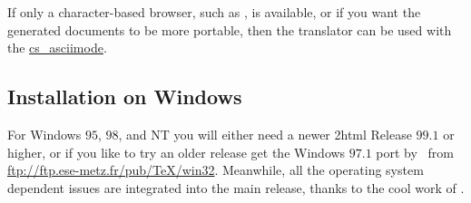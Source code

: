 %
%
\html{\\}%

If only a character-based browser, such as , is available, 
or if you want the generated documents to be more portable, 
then the translator can be used with the  
\hyperref{option}{option (see Section~}{)}{cs_asciimode}. 


\subsection{Installation on Windows}
\label{windowsinst}

%
For Windows $95$, $98$, and NT you will either need a newer
\latex2html{} Release $99.1$ or higher, or if you like to try an
older release get the Windows $97.1$ port by \Popineau\ from
\url{ftp://ftp.ese-metz.fr/pub/TeX/win32}.
Meanwhile, all the operating system dependent issues are integrated
into the main release, thanks to the cool work of \Rouchal.

